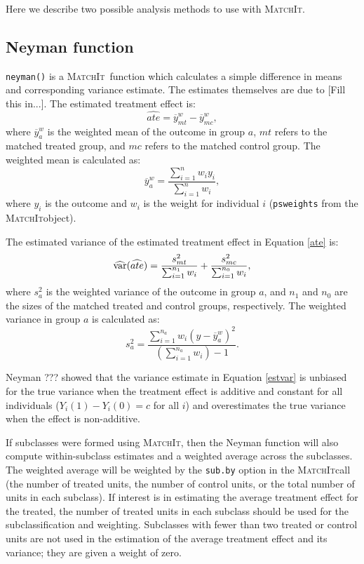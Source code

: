 \documentclass[oneside,letterpaper,titlepage]{article}
\newcommand{\MatchIt}{\textsc{MatchIt}}
\begin{document}
Here we describe two possible analysis methods to use with \MatchIt.    

\subsection{Neyman function}

{\tt neyman()} is a \MatchIt\ function which
calculates a simple difference in means and corresponding variance estimate.  The estimates themselves are due
to \cite{Neyman??} [Fill this in...].  The estimated treatment effect is:
\begin{equation}
\label{ate} 
\widehat{ate} = \overline{y}_{mt}^w-\overline{y}_{mc}^w,
\end{equation}
where $\overline{y}_a^w$ is the weighted mean of the outcome in group $a$, $mt$ refers to the matched treated group, and $mc$
refers to the matched control group.  The weighted mean is calculated as:
$$ \overline{y}_a^w = \frac{\sum_{i=1}^n w_i y_i}{\sum_{i=1}^n w_i},$$
where $y_i$ is the outcome and $w_i$ is the weight for individual $i$ ({\tt psweights} from the \MatchIt object).

The estimated variance of the estimated treatment effect in Equation \eqref{ate} is:
\begin{equation}
\label{estvar}
\widehat{{\rm var}}(\widehat{ate}) = \frac{s_{mt}^2}{\sum_{i=1}^{n_1} w_i} + \frac{s_{mc}^2}{\sum_{i=1}^{n_0} w_i},
\end{equation}
where $s_a^2$ is the weighted variance of the outcome in group $a$, and $n_1$ and $n_0$ are the sizes of the matched treated and control groups,
respectively.  The weighted variance in group $a$ is calculated as:
$$ s^2_{a} = \frac{\sum_{i=1}^{n_a} w_i (y-\overline{y}_a^w)^2}{(\sum_{i=1}^{n_a} w_i) - 1}.$$

Neyman ??? showed that the variance estimate in Equation \eqref{estvar} is unbiased for the true variance when the treatment effect is additive and constant
for all individuals ($Y_i(1)-Y_i(0)=c$ for all $i$) and overestimates the true variance when the effect is non-additive.  

If subclasses were formed using \MatchIt, then the Neyman function will also compute within-subclass estimates and a weighted average across the subclasses.
The weighted average will be weighted by the {\tt sub.by} option in the \MatchIt call (the number of treated units, the number of control
units, or the total number of units in each subclass).  If interest is in estimating the average treatment effect for the treated, the number of treated units
in each subclass should be used for the subclassification and weighting.  Subclasses with fewer than two treated or control units are not used
in the estimation of the average treatment effect and its variance; they are given a weight of zero.
\end{document}
